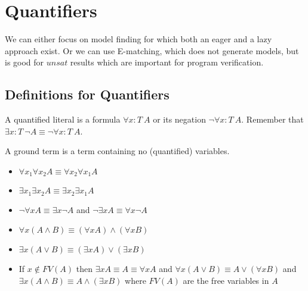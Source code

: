 \section{Quantifiers}
\begin{mytitle}[Approaches] We can either focus on model finding for which both an eager and a lazy approach exist. Or we can use E-matching, which does not generate models, but is good for $unsat$ results which are important for program verification. 
\end{mytitle}
\subsection{Definitions for Quantifiers}
\begin{mytitle} A quantified literal is a formula $\forall x: T\ A$ or its negation $\lnot \forall x: T\ A$. Remember that $\exists x: T\ \lnot A \equiv \lnot\forall x: T\ A$.
\end{mytitle}
\begin{mytitle} A ground term is a term containing no (quantified) variables.
\end{mytitle}
\begin{mytitle}[Equalities]\hfill
\begin{itemize}
    \item $\forall x_1 \forall x_2 A \equiv \forall x_2 \forall x_1 A$
    \item $\exists x_1 \exists x_2 A \equiv \exists x_2 \exists x_1 A$
    \item $\lnot \forall x A \equiv \exists x \lnot A$ and $\lnot \exists x A \equiv \forall x \lnot A$
    \item $\forall x (A \land B) \equiv (\forall x A) \land (\forall x B)$
    \item $\exists x (A\lor B) \equiv (\exists x A) \lor (\exists x B)$
    \item If $x\not\in FV(A)$ then $\exists x A \equiv A \equiv \forall x A$ and $\forall x (A\lor B) \equiv A \lor (\forall x B)$ and $\exists x (A\land B) \equiv A \land (\exists x B)$ where $FV(A)$ are the free variables in $A$
\end{itemize}
\end{mytitle}

